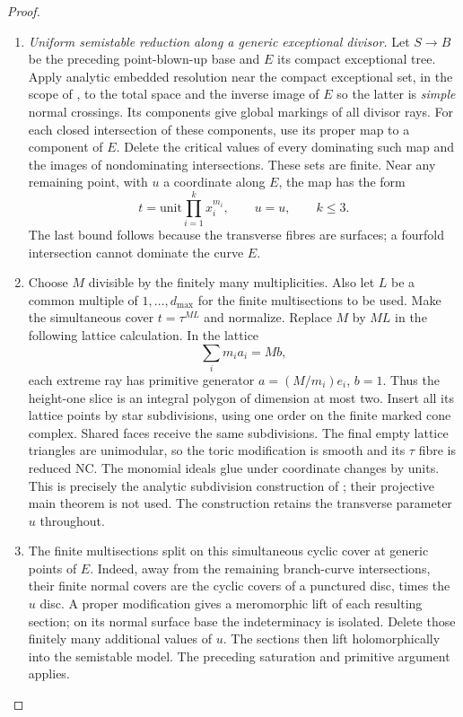 \begin{proof}
\begin{enumerate}[label=\arabic*.,leftmargin=*]
\item \emph{Uniform semistable reduction along a generic exceptional divisor.}
Let $S\to B$ be the preceding point-blown-up
base and $E$ its compact exceptional tree.
Apply analytic embedded resolution near
the compact exceptional set, in the scope of
\citet[Theorems 1.6 and 1.10]{BM95AB}, to
the total space and the inverse image of $E$
so the latter is \emph{simple} normal crossings. Its components give global
markings of all divisor rays. For each closed
intersection of these components, use its
proper map to a component of $E$. Delete the
critical values of every dominating such map
and the images of nondominating intersections.
These sets are finite. Near any remaining
point, with $u$ a coordinate along $E$, the
map has the form
\[
 t=\text{unit}\prod_{i=1}^k x_i^{m_i},
 \qquad u=u,\qquad k\le3.
 \tag{B.4.30.9}
\]
The last bound follows because the transverse
fibres are surfaces; a fourfold intersection
cannot dominate the curve $E$.

\item Choose $M$ divisible by the finitely many
multiplicities. Also let $L$ be a common
multiple of $1,\ldots,d_{\max}$ for the
finite multisections to be used. Make the
simultaneous cover $t=\tau^{ML}$ and
normalize. Replace $M$ by $ML$ in the
following lattice calculation. In the lattice
\[
 \sum_i m_i a_i=M b,
\]
each extreme ray has primitive generator
$a=(M/m_i)e_i$, $b=1$. Thus the height-one
slice is an integral polygon of dimension
at most two. Insert all its lattice points
by star subdivisions, using one order on the
finite marked cone complex. Shared faces
receive the same subdivisions. The final
empty lattice triangles are unimodular, so
the toric modification is smooth and its
$\tau$ fibre is reduced NC. The monomial
ideals glue under coordinate changes by
units. This is precisely the analytic
subdivision construction of
\citet[Lemma 2.14, pp.~6--7]{EH2024E}; their
projective main theorem is not used.
The construction retains the transverse
parameter $u$ throughout.

\item The finite multisections split on this
simultaneous cyclic cover at generic points
of $E$.
Indeed, away from the remaining branch-curve
intersections, their finite normal covers
are the cyclic covers of a punctured disc,
times the $u$ disc. A proper modification
gives a meromorphic lift of each resulting
section; on its normal surface base the
indeterminacy is isolated. Delete those
finitely many additional values of $u$.
The sections then lift holomorphically into
the semistable model. The preceding
saturation and primitive argument applies.


\end{enumerate}
\end{proof}
